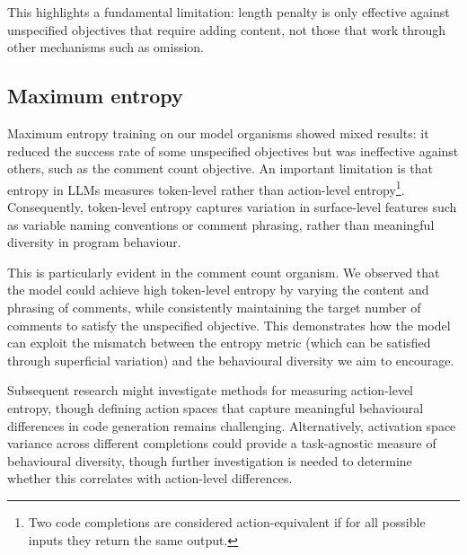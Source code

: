 This highlights a fundamental limitation: length penalty is only effective against unspecified objectives that require adding content, not those that work through other mechanisms such as omission.

\subsection{Maximum entropy}

Maximum entropy training on our model organisms showed mixed results: it reduced the success rate of some unspecified objectives but was ineffective against others, such as the comment count objective. An important limitation is that entropy in LLMs measures token-level rather than action-level entropy\footnote{Two code completions are considered action-equivalent if for all possible inputs they return the same output.}. Consequently, token-level entropy captures variation in surface-level features such as variable naming conventions or comment phrasing, rather than meaningful diversity in program behaviour.

This is particularly evident in the comment count organism. We observed that the model could achieve high token-level entropy by varying the content and phrasing of comments, while consistently maintaining the target number of comments to satisfy the unspecified objective. This demonstrates how the model can exploit the mismatch between the entropy metric (which can be satisfied through superficial variation) and the behavioural diversity we aim to encourage.

Subsequent research might investigate methods for measuring action-level entropy, though defining action spaces that capture meaningful behavioural differences in code generation remains challenging. Alternatively, activation space variance across different completions could provide a task-agnostic measure of behavioural diversity, though further investigation is needed to determine whether this correlates with action-level differences.






